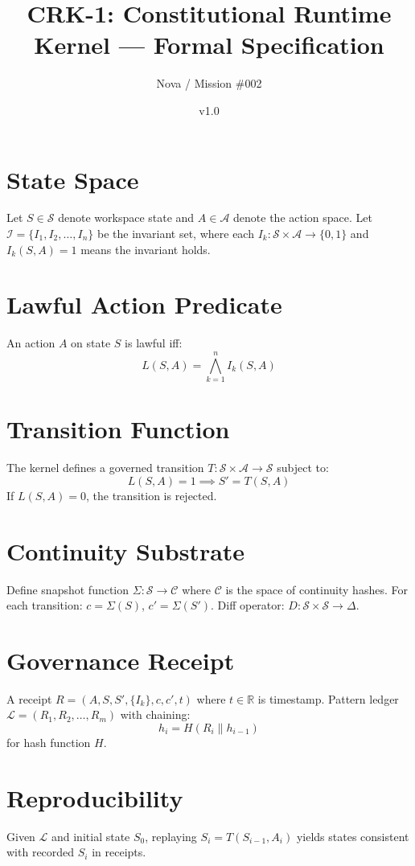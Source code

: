 \documentclass{article}
\title{CRK-1: Constitutional Runtime Kernel --- Formal Specification}
\author{Nova / Mission \#002}
\date{v1.0}
\begin{document}
\maketitle

\section{State Space}
Let $S \in \mathcal{S}$ denote workspace state and $A \in \mathcal{A}$ denote the action space.
Let $\mathcal{I} = \{I_1, I_2, \ldots, I_n\}$ be the invariant set, where each
$I_k : \mathcal{S} \times \mathcal{A} \to \{0,1\}$ and $I_k(S,A)=1$ means the invariant holds.

\section{Lawful Action Predicate}
An action $A$ on state $S$ is lawful iff:
\[
L(S,A) = \bigwedge_{k=1}^{n} I_k(S,A)
\]

\section{Transition Function}
The kernel defines a governed transition $T : \mathcal{S} \times \mathcal{A} \to \mathcal{S}$ subject to:
\[
L(S,A) = 1 \implies S' = T(S,A)
\]
If $L(S,A) = 0$, the transition is rejected.

\section{Continuity Substrate}
Define snapshot function $\Sigma : \mathcal{S} \to \mathcal{C}$ where $\mathcal{C}$ is the space of continuity hashes.
For each transition: $c = \Sigma(S)$, $c' = \Sigma(S')$.
Diff operator: $D : \mathcal{S} \times \mathcal{S} \to \Delta$.

\section{Governance Receipt}
A receipt $R = (A, S, S', \{I_k\}, c, c', t)$ where $t \in \mathbb{R}$ is timestamp.
Pattern ledger $\mathcal{L} = (R_1, R_2, \ldots, R_m)$ with chaining:
\[
h_i = H(R_i \parallel h_{i-1})
\]
for hash function $H$.

\section{Reproducibility}
Given $\mathcal{L}$ and initial state $S_0$, replaying $S_i = T(S_{i-1}, A_i)$ yields states consistent with recorded $S_i$ in receipts.
\end{document}
